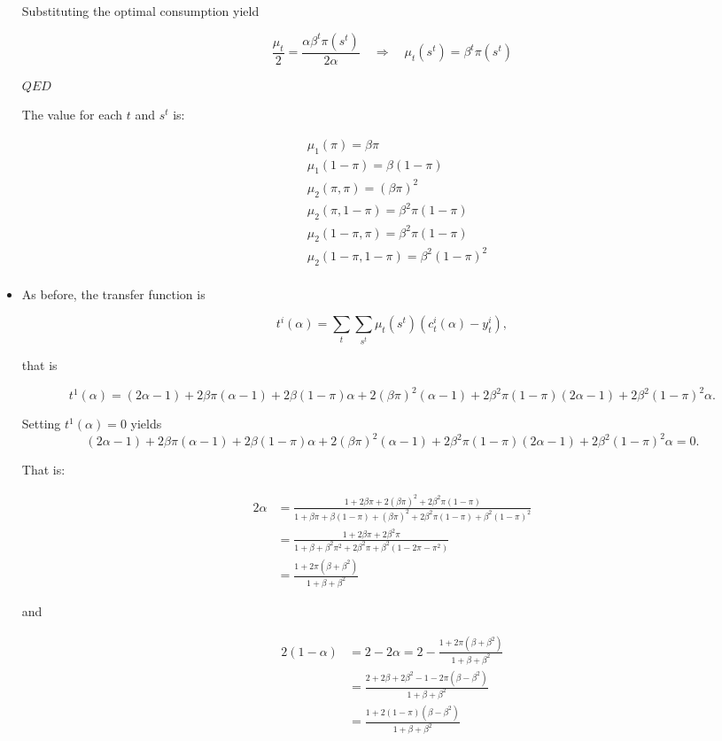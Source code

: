 \documentclass[12pt,a4paper]{article}
\begin{document}
\begin{itemize}
  Substituting the optimal consumption yield

  $$
    \frac{\mu_t}{2} = \frac{\alpha\beta^t \pi(s^t)}{ 2 \alpha} \quad \Rightarrow \quad \mu_t(s^t) = \beta^t \pi(s^t)
  $$

  $QED$

  The value for each $t$ and $s^t$ is:

  \begin{align*}
    & \mu_1(\pi)  = \beta \pi \\
    & \mu_1(1 - \pi)  = \beta (1 - \pi) \\
    & \mu_2(\pi, \pi)  = (\beta \pi)^2 \\
    & \mu_2(\pi, 1 - \pi)  = \beta^2 \pi (1 - \pi) \\
    & \mu_2(1 - \pi, \pi)  = \beta^2 \pi (1 - \pi) \\
    & \mu_2(1 - \pi, 1 - \pi)  = \beta^2 (1 - \pi)^2 \\
  \end{align*}

  \item As before, the transfer function is

    $$
      t^i(\alpha) = \sum_{t} \sum_{s^t} \mu_t(s^t) \left( c_t^i(\alpha)- y_t^i \right),
    $$

  that is

    $$
    t^1(\alpha) = (2\alpha - 1) + 2\beta \pi(\alpha - 1) + 2\beta (1 - \pi)\alpha + 2(\beta \pi)^2 (\alpha - 1) + 2 \beta^2 \pi (1 - \pi) (2 \alpha - 1) + 2 \beta^2 (1 - \pi)^2 \alpha.
    $$

  Setting  $t^1(\alpha)=0$ yields
  $$
  (2\alpha - 1) + 2\beta \pi(\alpha - 1) + 2\beta (1 - \pi)\alpha + 2(\beta \pi)^2 (\alpha - 1) + 2 \beta^2 \pi (1 - \pi) (2 \alpha - 1) + 2 \beta^2 (1 - \pi)^2 \alpha = 0.
  $$

  That is:

  \begin{align*}
    2 \alpha & = \frac{1 + 2\beta\pi + 2 (\beta\pi)^2 + 2\beta^2\pi(1-\pi)}{1 + \beta\pi + \beta(1 - \pi) + (\beta\pi)^2 + 2 \beta^2\pi(1-\pi) + \beta^2 (1 - \pi)^2} \\
    & = \frac{1 + 2\beta\pi + 2\beta^2\pi }{1 + \beta + \beta^2\pi^2 + 2\beta^2 \pi + \beta^2(1-2\pi-\pi^2)} \\
    & = \frac{1 + 2\pi(\beta + \beta^2)}{1 + \beta + \beta^2}
  \end{align*}

  and

  \begin{align*}
    2(1-\alpha) & = 2 - 2\alpha = 2 -\frac{1 + 2\pi(\beta + \beta^2)}{1 + \beta + \beta^2} \\
    & = \frac{2 + 2\beta + 2 \beta^2 - 1 - 2\pi(\beta - \beta^2)}{1 + \beta + \beta^2} \\
    & = \frac{1 + 2(1 -\pi)(\beta - \beta^2)}{1 + \beta + \beta^2}
  \end{align*}


\end{itemize}
\end{document}
